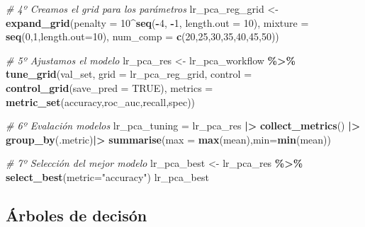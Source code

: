\documentclass[12pt,a4paper,]{book}
\newenvironment{Shaded}{\begin{snugshade}}{\end{snugshade}}
\newcommand{\AttributeTok}[1]{\textcolor[rgb]{0.13,0.29,0.53}{#1}}
\newcommand{\CommentTok}[1]{\textcolor[rgb]{0.56,0.35,0.01}{\textit{#1}}}
\newcommand{\ConstantTok}[1]{\textcolor[rgb]{0.56,0.35,0.01}{#1}}
\newcommand{\DecValTok}[1]{\textcolor[rgb]{0.00,0.00,0.81}{#1}}
\newcommand{\FunctionTok}[1]{\textcolor[rgb]{0.13,0.29,0.53}{\textbf{#1}}}
\newcommand{\NormalTok}[1]{#1}
\newcommand{\OtherTok}[1]{\textcolor[rgb]{0.56,0.35,0.01}{#1}}
\newcommand{\SpecialCharTok}[1]{\textcolor[rgb]{0.81,0.36,0.00}{\textbf{#1}}}
\newcommand{\StringTok}[1]{\textcolor[rgb]{0.31,0.60,0.02}{#1}}
\numberwithin{dummy}{section}
\theoremstyle{ocrenumbox}
\theoremstyle{blacknumex}
\theoremstyle{blacknumbox}
\theoremstyle{ocrenum}
\theoremstyle{ocrenum}
\begin{document}
\begin{Shaded}
\begin{Highlighting}[]
\CommentTok{\# 4º Creamos el grid para los parámetros}
\NormalTok{lr\_pca\_reg\_grid }\OtherTok{\textless{}{-}} \FunctionTok{expand\_grid}\NormalTok{(}\AttributeTok{penalty =} \DecValTok{10}\SpecialCharTok{\^{}}\FunctionTok{seq}\NormalTok{(}\SpecialCharTok{{-}}\DecValTok{4}\NormalTok{, }\SpecialCharTok{{-}}\DecValTok{1}\NormalTok{, }\AttributeTok{length.out =} \DecValTok{10}\NormalTok{),}
                               \AttributeTok{mixture =} \FunctionTok{seq}\NormalTok{(}\DecValTok{0}\NormalTok{,}\DecValTok{1}\NormalTok{,}\AttributeTok{length.out=}\DecValTok{10}\NormalTok{),}
                               \AttributeTok{num\_comp =} \FunctionTok{c}\NormalTok{(}\DecValTok{20}\NormalTok{,}\DecValTok{25}\NormalTok{,}\DecValTok{30}\NormalTok{,}\DecValTok{35}\NormalTok{,}\DecValTok{40}\NormalTok{,}\DecValTok{45}\NormalTok{,}\DecValTok{50}\NormalTok{))}

\CommentTok{\# 5º Ajustamos el modelo}
\NormalTok{lr\_pca\_res }\OtherTok{\textless{}{-}} 
\NormalTok{  lr\_pca\_workflow }\SpecialCharTok{\%\textgreater{}\%} 
  \FunctionTok{tune\_grid}\NormalTok{(val\_set,}
            \AttributeTok{grid =}\NormalTok{ lr\_pca\_reg\_grid,}
            \AttributeTok{control =} \FunctionTok{control\_grid}\NormalTok{(}\AttributeTok{save\_pred =} \ConstantTok{TRUE}\NormalTok{),}
            \AttributeTok{metrics =} \FunctionTok{metric\_set}\NormalTok{(accuracy,roc\_auc,recall,spec))}

\CommentTok{\# 6º Evalación modelos}
\NormalTok{lr\_pca\_tuning }\OtherTok{=}\NormalTok{ lr\_pca\_res }\SpecialCharTok{|\textgreater{}} 
  \FunctionTok{collect\_metrics}\NormalTok{() }\SpecialCharTok{|\textgreater{}} 
  \FunctionTok{group\_by}\NormalTok{(.metric)}\SpecialCharTok{|\textgreater{}} 
  \FunctionTok{summarise}\NormalTok{(}\AttributeTok{max =} \FunctionTok{max}\NormalTok{(mean),}\AttributeTok{min=}\FunctionTok{min}\NormalTok{(mean))}

\CommentTok{\# 7º Selección del mejor modelo}
\NormalTok{lr\_pca\_best }\OtherTok{\textless{}{-}} 
\NormalTok{  lr\_pca\_res }\SpecialCharTok{\%\textgreater{}\%} 
  \FunctionTok{select\_best}\NormalTok{(}\AttributeTok{metric=}\StringTok{"accuracy"}\NormalTok{)}
\NormalTok{lr\_pca\_best}
\end{Highlighting}
\end{Shaded}

\hypertarget{uxe1rboles-de-decisuxf3n}{%
\subsection{Árboles de decisón}\label{uxe1rboles-de-decisuxf3n}}
\end{document}
